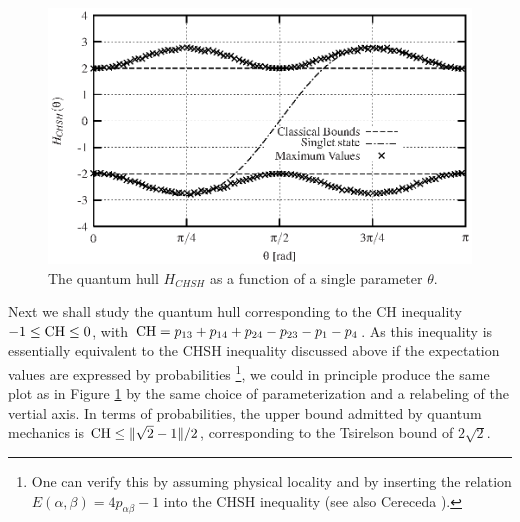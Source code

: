 \begin{figure}[!ht]
  \centering
  \includegraphics{2003-qpoly-plotchsh}
  \caption{The quantum hull $H_{CHSH}$
as a function of a single parameter $\theta$.}
  \label{f-2003-qpoly-2}
\end{figure}

Next we shall study the quantum hull corresponding to the CH inequality
$ -1\le {\rm CH} \leq 0$,
with $
{\rm CH} = p_{13} + p_{14} + p_{24} - p_{23} - p_{1} - p_{4}
$.
As this inequality is essentially equivalent to the CHSH inequality
discussed above if the expectation values are expressed by probabilities
\footnote{One can  verify this by assuming physical locality \cite{mermin-1995}
and by inserting the
  relation $E(\alpha,\beta) = 4p_{\alpha\beta} - 1$ into the CHSH
  inequality (see also Cereceda \cite{cereceda-2001}).}, we could in principle produce the same plot as in Figure
\ref{f-2003-qpoly-2} by the same choice of parameterization and a
relabeling of the vertial axis.
In terms of
probabilities,
the upper bound admitted by quantum mechanics is
${\rm CH} \le \|\sqrt{2}-1\| /2$, corresponding to the Tsirelson bound of $2\sqrt{2}$.


